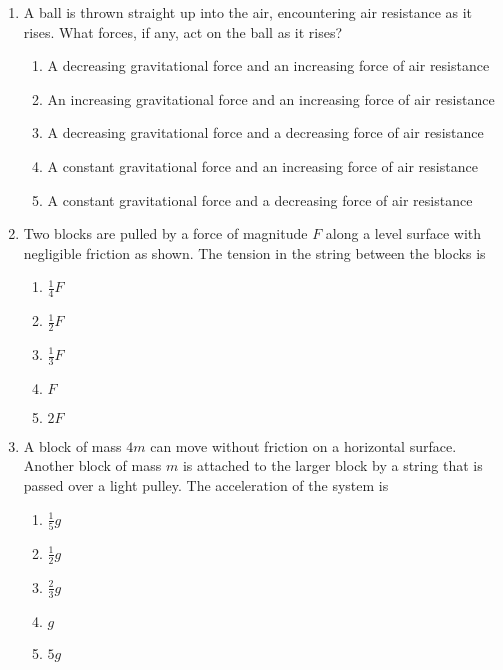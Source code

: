 \documentclass{../../../oss-apphys}
\begin{document}
\begin{multicols}{2}
\begin{enumerate}[resume,leftmargin=18pt]
  \item A ball is thrown straight up into the air, encountering air resistance
    as it rises. What forces, if any, act on the ball as it rises?
    \begin{enumerate}[nosep,leftmargin=18pt,label=(\Alph*)]
    \item A decreasing gravitational force and an increasing force of air
      resistance
    \item An increasing gravitational force and an increasing force of air
      resistance
    \item A decreasing gravitational force and a decreasing force of air
      resistance
    \item A constant gravitational force and an increasing force of air
      resistance
    \item A constant gravitational force and a decreasing force of air
      resistance
    \end{enumerate}

  \item Two blocks are pulled by a force of magnitude $F$ along a level surface
    with negligible friction as shown. The tension in the string between the
    blocks is
    
    \begin{enumerate}[nosep,leftmargin=18pt,label=(\Alph*)]
    \item $\displaystyle\frac14F$
    \item $\displaystyle\frac12F$
    \item $\displaystyle\frac13F$
    \item $F$
    \item $2F$
    \end{enumerate}

  \item A block of mass $4m$ can move without friction on a horizontal surface.
    Another block of mass $m$ is attached to the larger block by a string that
    is passed over a light pulley. The acceleration of the system is
    \begin{enumerate}[nosep,leftmargin=18pt,label=(\Alph*)]
    \item $\displaystyle\frac15g$
    \item $\displaystyle\frac12g$
    \item $\displaystyle\frac23g$
    \item $g$
    \item $5g$
    \end{enumerate}



\end{enumerate}
\end{multicols}
\end{document}
